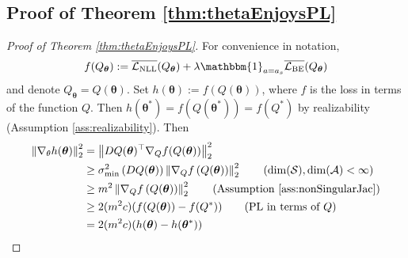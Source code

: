 \subsection{Proof of Theorem \ref{thm:thetaEnjoysPL}}\label{sec:proofOfthetaEnjoysPL}
\begin{proof}[Proof of Theorem \ref{thm:thetaEnjoysPL}] 
For convenience in notation,
$$
f(Q_{\boldsymbol{\theta}}):=\overline{\mathcal{L}_{\mathrm{NLL}}}(Q_{\boldsymbol{\theta}})+\lambda \mathbbm{1}_{a=a_s}\overline{\mathcal{L}_{\mathrm{BE}}}(Q_{\boldsymbol{\theta}})
$$
and denote $Q_{\boldsymbol{\theta}} = Q (\boldsymbol{\theta})$. Set $
h(\boldsymbol{\theta}):=f(Q(\boldsymbol{\theta}))
$, where $f$ is the loss in terms of the function $Q$. Then $
h\left(\boldsymbol{\theta}^*\right)=f\left(Q\left(\boldsymbol{\theta}^*\right)\right)=f\left(Q^*\right)
$
by realizability (Assumption \ref{ass:realizability}). Then
\begin{align}
    \left\|\nabla_\theta h(\boldsymbol{\theta})\right\|_2^2&=\left\|D Q({\boldsymbol{\theta}})^{\top} \nabla_Q f(Q(\boldsymbol{\theta}))\right\|_2^2 \notag
    \\
    &\ge \sigma^2_{\min} \left(D Q(\boldsymbol{\theta})\right)\left\|\nabla_Q f\left(Q({\boldsymbol{\theta})}\right)\right\|_2^2 \tag{$\dim(\mathcal{S}), \dim(\mathcal{A})<\infty$}
    \\
    &\ge m^2 \left\|\nabla_Q f\left(Q({\boldsymbol{\theta}})\right)\right\|_2^2\tag{Assumption \ref{ass:nonSingularJac}}
    \\
    &\ge 2(m^2 c)(f(Q({\boldsymbol{\theta}}))-f(Q^\ast)) \tag{PL in terms of $Q$}
    \\
    &=2(m^2c)(h(\boldsymbol{\theta})-h(\boldsymbol{\theta}^\ast)) \notag
\end{align}
\end{proof}


